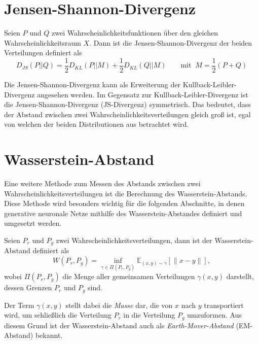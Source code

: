 \section{Jensen-Shannon-Divergenz}
\begin{definition}
Seien $P$ und $Q$ zwei Wahr\-schein\-lichkeitsfunktionen über den gleichen
Wahrscheinlichkeitsraum $X$. Dann ist die Jensen-Shannon-Divergenz der
beiden Verteilungen definiert als
\[
    D_{JS}(P \lvert\lvert Q) = \frac{1}{2} D_{KL}(P \lvert\lvert M) + \frac{1}{2} D_{KL}(Q \lvert\lvert M) \quad\quad \text{mit} \;\; M = \frac{1}{2}(P + Q)
\]
\end{definition}
Die Jensen-Shannon-Divergenz kann als Erweiterung der
Kullback-Leibler-Divergenz angesehen werden. Im Gegensatz zur
Kullback-Leibler-Divergenz ist die Jensen-Shannon-Divergenz (JS-Divergenz)
symmetrisch. Das bedeutet, dass der Abstand zwischen zwei
Wahrscheinlichkeitsverteilungen gleich groß ist, egal von welchen der beiden
Distributionen aus betrachtet wird.

\section{Wasserstein-Abstand}
Eine weitere Methode zum Messen des Abstands zwischen zwei
Wahrscheinlichkeitsverteilungen ist die Berechnung des Wasserstein-Abstands.
Diese Methode wird besonders wichtig für die folgenden Abschnitte, in denen
generative neuronale Netze mithilfe des Wasserstein-Abstandes definiert und
umgesetzt werden.

\begin{definition}
Seien $P_r$ und $P_g$ zwei Wahrscheinlichkeitsverteilungen, dann ist der
Wasserstein-Abstand definiert als
\[
    W(P_r, P_g) = \inf_{\gamma \in \Pi(P_r, P_g)} \mathbb{E}_{(x, y) \sim \gamma} \left[\|x - y\|\right],
\]
wobei $\Pi(P_r, P_g)$ die Menge aller gemeinsamen Verteilungen $\gamma(x,
y)$ darstellt, dessen Grenzen $P_r$ und $P_g$ sind.
\end{definition}

Der Term $\gamma(x, y)$ stellt dabei die \textit{Masse} dar, die von $x$ nach
$y$ transportiert wird, um schließlich die Verteilung $P_r$ in die Verteilung
$P_g$ umzuformen. Aus diesem Grund ist der Wasserstein-Abstand auch als
\textit{Earth-Mover-Abstand} (EM-Abstand) bekannt.


